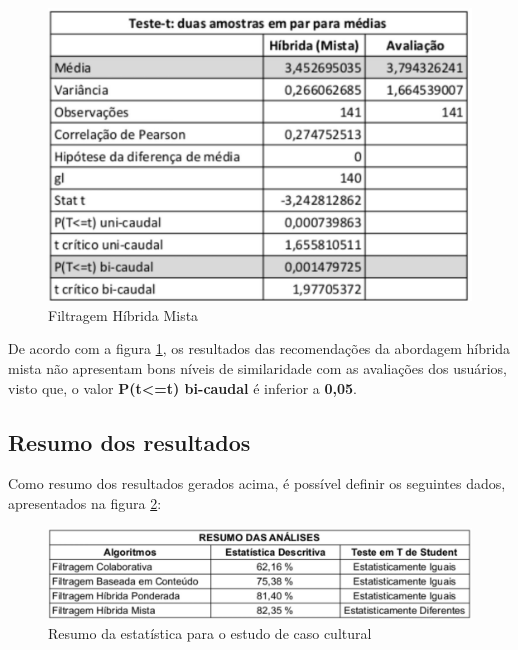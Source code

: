 \begin{figure}[H]
	\centering
	\includegraphics[width=.6\linewidth]{imagens/findmusicTesteTMista.jpg}
	\caption[Teste T: Filtragem Híbrida Mista]{Filtragem Híbrida Mista}
    \label{fig:findMusicTesteTMista}
\end{figure}

De acordo com a figura \ref{fig:findMusicTesteTMista}, os resultados das recomendações da abordagem híbrida mista não apresentam bons níveis de similaridade com as avaliações dos usuários, visto que, o valor \textbf{P(t<=t) bi-caudal} é inferior a \textbf{0,05}.

\subsection{Resumo dos resultados}

Como resumo dos resultados gerados acima, é possível definir os seguintes dados, apresentados na figura \ref{fig:resumoEstatisticaCultural}:

\begin{figure}[H]
	\centering
	\includegraphics[width=.8\linewidth]{imagens/resumoEstatisticaCultural.jpg}
	\caption[Resumo da estatística para o estudo de caso cultural]{Resumo da estatística para o estudo de caso cultural}
    \label{fig:resumoEstatisticaCultural}
\end{figure}